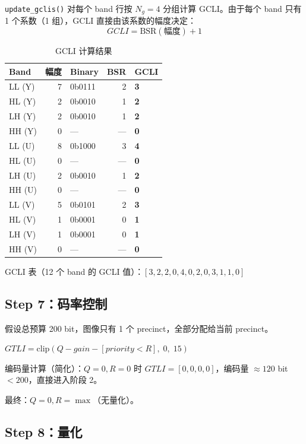 \texttt{update\_gclis()} 对每个 band 行按 $N_g=4$ 分组计算 GCLI。由于每个 band 只有 1 个系数（1 组），GCLI 直接由该系数的幅度决定：
\begin{equation}
\mathit{GCLI} = \mathrm{BSR}(\text{幅度}) + 1
\end{equation}

\begin{table}[H]
\centering
\caption{GCLI 计算结果}
\label{tab:e2e-gcli}
\begin{tabular}{@{}lrlrl@{}}
\toprule
Band & 幅度 & Binary & BSR & GCLI \\
\midrule
LL (Y) & 7  & 0b0111 & 2 & \textbf{3} \\
HL (Y) & 2  & 0b0010 & 1 & \textbf{2} \\
LH (Y) & 2  & 0b0010 & 1 & \textbf{2} \\
HH (Y) & 0  & ---    & --- & \textbf{0} \\
LL (U) & 8  & 0b1000 & 3 & \textbf{4} \\
HL (U) & 0  & ---    & --- & \textbf{0} \\
LH (U) & 2  & 0b0010 & 1 & \textbf{2} \\
HH (U) & 0  & ---    & --- & \textbf{0} \\
LL (V) & 5  & 0b0101 & 2 & \textbf{3} \\
HL (V) & 1  & 0b0001 & 0 & \textbf{1} \\
LH (V) & 1  & 0b0001 & 0 & \textbf{1} \\
HH (V) & 0  & ---    & --- & \textbf{0} \\
\bottomrule
\end{tabular}
\end{table}

GCLI 表（12 个 band 的 GCLI 值）：$[3, 2, 2, 0, 4, 0, 2, 0, 3, 1, 1, 0]$

\subsection{Step 7：码率控制}

假设总预算 200 bit，图像只有 1 个 precinct，全部分配给当前 precinct。

$\mathit{GTLI} = \mathrm{clip}(Q - \mathit{gain} - [\mathit{priority} < R],\; 0,\; 15)$

编码量计算（简化）：$Q=0, R=0$ 时 $\mathit{GTLI} = [0, 0, 0, 0]$，编码量 $\approx 120$ bit $< 200$，直接进入阶段 2。

最终：$Q=0, R=\max$（无量化）。

\subsection{Step 8：量化}

